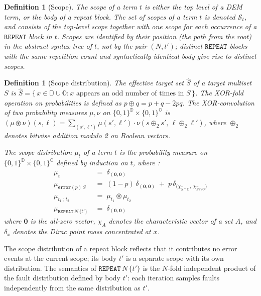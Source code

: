 \documentclass[11pt,a4paper]{article}
\newtheorem{definition}[theorem]{Definition}
\newcommand{\xorfold}{\oplus}          %
\newcommand{\scope}[1]{\mathcal{S}_{#1}}
\newcommand{\dist}[1]{\mu_{#1}}   %
\begin{document}
\begin{definition}[Scope]
\label{def:term-properties}
The scope of a term $t$ is either the top level of a DEM term, or the body of a repeat block. The set of scopes of a term $t$ is denoted $\scope{t}$, and consists of the top-level scope together with one scope for each occurrence of a $\mathtt{REPEAT}$ block in $t$. Scopes are identified by their position (the path from the root) in the abstract syntax tree of $t$, not by the pair $(N, t')$; distinct $\mathtt{REPEAT}$ blocks with the same repetition count and syntactically identical body give rise to distinct scopes.
\end{definition}

\begin{definition}[Scope distribution]
\label{def:scope-dist}
The \emph{effective target set} $\widehat{S}$ of a target multiset $S$ is
$\widehat{S} = \{\,x \in \mathbb{D} \cup \mathbb{O} : x \text{ appears an odd number of times in } S\,\}$.
The \emph{XOR-fold} operation on probabilities is defined as $p \xorfold q = p + q - 2pq$.
The \emph{XOR-convolution} of two probability measures $\mu, \nu$ on
$\{0,1\}^{\mathbb{D}} \times \{0,1\}^{\mathbb{O}}$ is
$(\mu \circledast \nu)(s, \ell) = \sum_{(s',\ell')} \mu(s',\ell') \cdot \nu(s \oplus_2 s',\, \ell \oplus_2 \ell')$,
where $\oplus_2$ denotes bitwise addition modulo 2 on Boolean vectors.

The \emph{scope distribution} $\dist{t}$ of a term $t$
is the probability measure on $\{0,1\}^{\mathbb{D}} \times \{0,1\}^{\mathbb{O}}$
defined by induction on $t$, where :
\begin{align*}
  \dist{\varepsilon}
    &\;=\; \delta_{(\mathbf{0},\mathbf{0})} \\
  \dist{\mathtt{error}(p)\,S}
    &\;=\; (1-p)\,\delta_{(\mathbf{0},\mathbf{0})}
           \;+\; p\,\delta_{\bigl(\chi_{\widehat{S}\cap\mathbb{D}},\;\chi_{\widehat{S}\cap\mathbb{O}}\bigr)} \\
  \dist{t_1 \,;\, t_2}
    &\;=\; \dist{t_1} \circledast \dist{t_2} \\
  \dist{\mathtt{REPEAT}\,N\,\{t'\}}
    &\;=\; \delta_{(\mathbf{0},\mathbf{0})}
\end{align*}
where $\mathbf{0}$ is the all-zero vector, $\chi_A$ denotes the characteristic vector of a set $A$, and $\delta_x$ denotes the Dirac point mass concentrated at $x$.

\end{definition}

The scope distribution of a repeat block reflects that it contributes no error events at the current scope; its body $t'$ is a separate scope with its own distribution. The semantics of $\mathtt{REPEAT}\,N\,\{t'\}$ is the $N$-fold independent product of the fault distribution defined by body $t'$: each iteration samples faults independently from the same distribution as $t'$.
\end{document}
